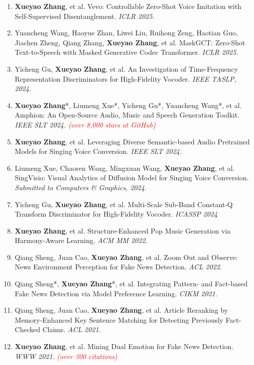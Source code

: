 \documentclass{resume}
\begin{document}
\begin{enumerate}\itemsep 0.5em
  \item \textbf{Xueyao Zhang}, et al. Vevo: Controllable Zero-Shot Voice Imitation with Self-Supervised Disentanglement. \textit{ICLR 2025}.
  \item Yuancheng Wang, Haoyue Zhan, Liwei Liu, Ruihong Zeng, Haotian Guo, Jiachen Zheng, Qiang Zhang, \textbf{Xueyao Zhang}, et al. MaskGCT: Zero-Shot Text-to-Speech with Masked Generative Codec Transformer. \textit{ICLR 2025}.
  \item Yicheng Gu, \textbf{Xueyao Zhang}, et al. An Investigation of Time-Frequency Representation Discriminators for High-Fidelity Vocoder. \textit{IEEE TASLP, 2024.}
  \item \textbf{Xueyao Zhang}*, Liumeng Xue*, Yicheng Gu*, Yuancheng Wang*, et al. Amphion: An Open-Source Audio, Music and Speech Generation Toolkit. \textit{IEEE SLT 2024.} \textcolor{red}{\textit{(over 8,000 stars at GitHub)}}
  \item \textbf{Xueyao Zhang}, et al. Leveraging Diverse Semantic-based Audio Pretrained Models for Singing Voice Conversion. \textit{IEEE SLT 2024.}
  \item Liumeng Xue, Chaoren Wang, Mingxuan Wang, \textbf{Xueyao Zhang}, et al. SingVisio: Visual Analytics of Diffusion Model for Singing Voice Conversion. \textit{Submitted to Computers \& Graphics, 2024.}
  \item Yicheng Gu, \textbf{Xueyao Zhang}, et al. Multi-Scale Sub-Band Constant-Q Transform Discriminator for High-Fidelity Vocoder. \textit{ICASSP 2024}
  \item \textbf{Xueyao Zhang}, et al. Structure-Enhanced Pop Music Generation via Harmony-Aware Learning. \textit{ACM MM 2022.}
  \item Qiang Sheng, Juan Cao, \textbf{Xueyao Zhang}, et al. Zoom Out and Observe: News Environment Perception for Fake News Detection. \textit{ACL 2022}.
  \item Qiang Sheng*, \textbf{Xueyao Zhang}*, et al. Integrating Pattern- and
  Fact-based Fake News Detection via Model Preference Learning.
  \textit{CIKM 2021.}
  \item Qiang Sheng, Juan Cao, \textbf{Xueyao Zhang}, et al. Article Reranking by Memory-Enhanced Key Sentence Matching for Detecting Previously Fact-Checked Claims. \textit{ACL 2021.}
  \item \textbf{Xueyao Zhang}, et al. Mining Dual Emotion for Fake News Detection. \textit{WWW 2021.} \textcolor{red}{\textit{(over 300 citations)}}
\end{enumerate}
\end{document}
